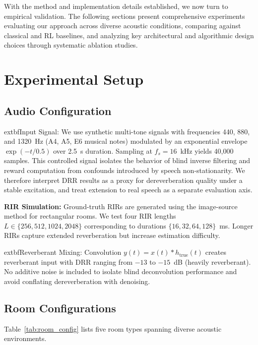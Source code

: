 \documentclass[12pt,a4paper]{article}
\begin{document}
With the method and implementation details established, we now turn to empirical validation. The following sections present comprehensive experiments evaluating our approach across diverse acoustic conditions, comparing against classical and RL baselines, and analyzing key architectural and algorithmic design choices through systematic ablation studies.

\section{Experimental Setup}

\subsection{Audio Configuration}

            extbf{Input Signal:} We use synthetic multi-tone signals with frequencies 440, 880, and 1320~Hz (A4, A5, E6 musical notes) modulated by an exponential envelope $\exp(-t/0.5)$ over 2.5~s duration. Sampling at $f_s=16$~kHz yields 40,000 samples. This controlled signal isolates the behavior of blind inverse filtering and reward computation from confounds introduced by speech non-stationarity. We therefore interpret DRR results as a proxy for dereverberation quality under a stable excitation, and treat extension to real speech as a separate evaluation axis.

\textbf{RIR Simulation:} Ground-truth RIRs are generated using the image-source method \cite{allen1979image} for rectangular rooms. We test four RIR lengths $L \in \{256, 512, 1024, 2048\}$ corresponding to durations $\{16, 32, 64, 128\}$~ms. Longer RIRs capture extended reverberation but increase estimation difficulty.

            extbf{Reverberant Mixing:} Convolution $y(t) = x(t) * h_{\text{true}}(t)$ creates reverberant input with DRR ranging from $-13$ to $-15$~dB (heavily reverberant). No additive noise is included to isolate blind deconvolution performance and avoid conflating dereverberation with denoising.

\subsection{Room Configurations}

Table~\ref{tab:room_config} lists five room types spanning diverse acoustic environments.
\end{document}
